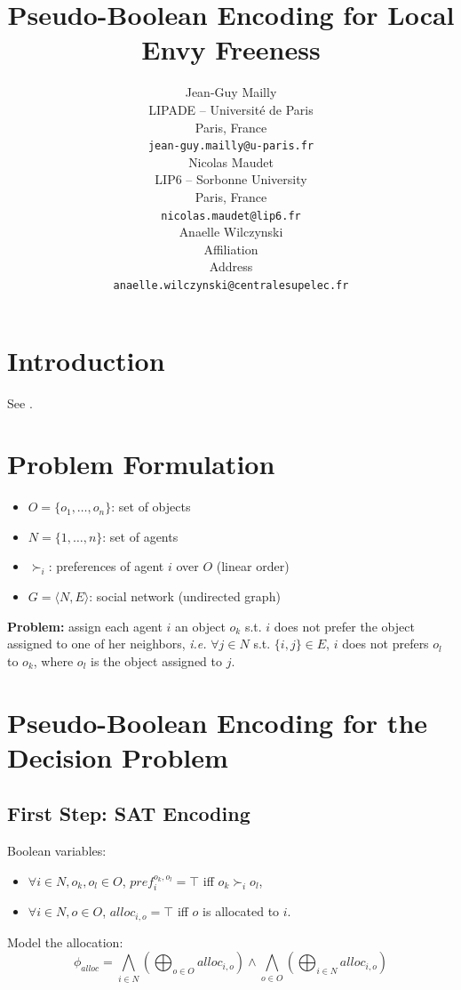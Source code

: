 \documentclass{article}
\title{Pseudo-Boolean Encoding for Local Envy Freeness}
\author{
  Jean-Guy Mailly\\
  LIPADE -- Université de Paris\\
  Paris, France\\
  \texttt{jean-guy.mailly@u-paris.fr} \\
   \And
Nicolas Maudet \\
LIP6 -- Sorbonne University\\
Paris, France\\
\texttt{nicolas.maudet@lip6.fr} \\
\And
Anaelle Wilczynski\\
  Affiliation \\
  Address \\
  \texttt{anaelle.wilczynski@centralesupelec.fr} \\
}
\begin{document}
\maketitle

\begin{abstract}
\lipsum[1]
\end{abstract}


\section{Introduction}
See \cite{BeynierCGHLMW19}.

\section{Problem Formulation}
\begin{itemize}
	\item $O = \{o_1, \dots, o_n\}$: set of objects
	\item $N = \{1,\dots,n\}$: set of agents
	\item $\succ_i$: preferences of agent $i$ over $O$ (linear order)
	\item $G = \langle N, E\rangle$: social network (undirected graph)
\end{itemize}
{\bf Problem:} assign each agent $i$ an object $o_k$ s.t. $i$ does not prefer the object assigned to one of her neighbors, {\em i.e.} $\forall j \in N$ s.t. $\{i,j\} \in E$, $i$ does not prefers $o_l$ to $o_k$, where $o_l$ is the object assigned to $j$.

\section{Pseudo-Boolean Encoding for the Decision Problem}
\subsection{First Step: SAT Encoding}
Boolean variables:
\begin{itemize}
	\item $\forall i \in N, o_k, o_l \in O$, $pref_i^{o_k,o_l} = \top$ iff $o_k \succ_i o_l$,
	\item $\forall i \in N, o \in O$, $alloc_{i,o} = \top$ iff $o$ is allocated to $i$.
\end{itemize}

Model the allocation:
\[
\phi_{alloc} = \bigwedge_{i \in N} (\bigoplus_{o \in O} alloc_{i,o}) \wedge \bigwedge_{o \in O} (\bigoplus_{i \in N} alloc_{i,o})
\]
\end{document}
